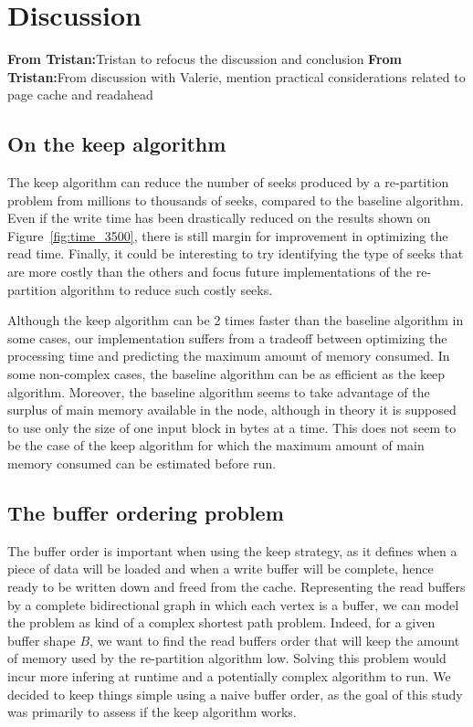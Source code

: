 \documentclass[sigconf, nonacm]{acmart}
\newcommand{\tristan}[1]{\color{orange}\textbf{From Tristan:}#1\color{black}}
\begin{document}
\section{Discussion}
\tristan{Tristan to refocus the discussion and conclusion}
\tristan{From discussion with Valerie, mention practical considerations related to page cache and readahead}

\subsection{On the keep algorithm}
The keep algorithm can reduce the number of seeks produced by a re-partition
problem from millions to thousands of seeks, compared to the baseline algorithm.
Even if the write time has been drastically reduced on the results shown on
Figure~\ref{fig:time_3500}, there is still margin for improvement in optimizing
the read time.
Finally, it could be interesting to try identifying the type of seeks that are
more costly than the others and focus future implementations of the re-partition
algorithm to reduce such costly seeks.

Although the keep algorithm can be 2 times faster than the baseline algorithm
in some cases, our implementation suffers from a tradeoff between optimizing
the processing time and predicting the maximum amount of memory consumed.
In some non-complex cases, the baseline algorithm can be as efficient as the
keep algorithm.
Moreover, the baseline algorithm seems to take advantage of the surplus of
main memory available in the node, although in theory it is supposed to use
only the size of one input block in bytes at a time.
This does not seem to be the case of the keep algorithm for which the maximum
amount of main memory consumed can be estimated before run.

\subsection{The buffer ordering problem}
The buffer order is important when using the keep strategy, as it defines when
a piece of data will be loaded and when a write buffer will be complete, hence
ready to be written down and freed from the cache.
Representing the read buffers by a complete bidirectional graph in which each
vertex is a buffer, we can model the problem as kind of a complex shortest path
problem.
Indeed, for a given buffer shape $B$, we want to find the read buffers order
that will keep the amount of memory used by the re-partition algorithm low.
Solving this problem would incur more infering at runtime and a potentially
complex algorithm to run.
We decided to keep things simple using a naive buffer order, as the goal of
this study was primarily to assess if the keep algorithm works.
\end{document}
